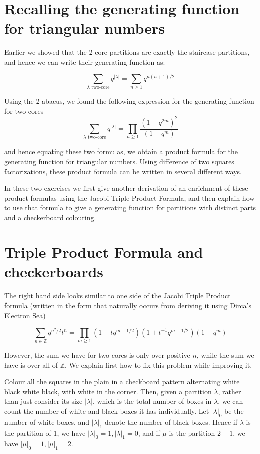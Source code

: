 \documentclass{article}
\theoremstyle{definition}
\begin{document}
\section{Recalling the generating function for triangular numbers}
Earlier we showed that the 2-core partitions are exactly the staircase partitions, and hence we can write their generating function as:

$$\sum_{\lambda \textrm{ two-core}}q^{|\lambda|}= \sum_{n\geq 1} q^{n(n+1)/2}$$

Using the 2-abacus, we found the following expression for the generating function for two cores
$$\sum_{\lambda \textrm{ two-core}}q^{|\lambda|}=\prod_{n\geq 1} \frac{(1-q^{2m})^2}{(1-q^m)}$$

and hence equating these two formulas, we obtain a product formula for the generating function for triangular numbers.  Using difference of two squares factorizations, these product formula can be written in several different ways.

In these two exercises we first give another derivation of an enrichment of these product formulas using the Jacobi Triple Product Formula, and then explain how to use that formula to give a generating function for partitions with distinct parts and a checkerboard colouring.


\section{Triple Product Formula and checkerboards}

The right hand side looks similar to one side of the Jacobi Triple Product formula (written in the form that naturally occurs from deriving it using Dirca's Electron Sea)

$$\sum_{n\in\mathbb{Z}} q^{n^2/2}t^n=\prod_{m\geq 1}(1+tq^{m-1/2})(1+t^{-1}q^{m-1/2})(1-q^m)$$

However, the sum we have for two cores is only over positive $n$, while the sum we have is over all of $\mathbb{Z}$.  We explain first how to fix this problem while improving it.

Colour all the squares in the plain in a checkboard pattern alternating white black white black, with white in the corner.  Then, given a partition $\lambda$, rather than just consider its size $|\lambda|$, which is the total number of boxes in $\lambda$, we can count the number of white and black boxes it has individually.  Let $|\lambda|_0$ be the number of white boxes, and $|\lambda|_1$ denote the number of black boxes.  Hence if $\lambda$ is the partition of 1, we have $|\lambda|_0=1, |\lambda|_1=0$, and if $\mu$ is the partition $2+1$, we have $|\mu|_0=1, |\mu|_1=2$.
\end{document}
